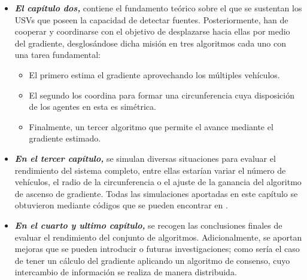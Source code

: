 \begin{itemize}
	\item \textbf{\emph{El capítulo dos,}} contiene el fundamento teórico sobre el que se sustentan los USVs que poseen la capacidad de detectar fuentes. Posteriormente, han de cooperar y coordinarse con el objetivo de desplazarse hacia ellas por medio del gradiente, desglosándose dicha misión en tres algoritmos cada uno con una tarea fundamental: 
	\begin{itemize}
		\item El primero estima el gradiente aprovechando los múltiples vehículos.
		\item El segundo los coordina para formar una circunferencia cuya disposición de los agentes en esta es simétrica.
		\item Finalmente, un tercer algoritmo que permite el avance mediante el gradiente estimado.
	\end{itemize}
	\item  \textbf{\emph{En el tercer capítulo,}} se simulan diversas situaciones para evaluar el rendimiento del sistema completo, entre ellas estarían variar el número de vehículos, el radio de la circunferencia o el ajuste de la ganancia del algoritmo de ascenso de gradiente. Todas las simulaciones aportadas en este capítulo se obtuvieron mediante códigos que se pueden encontrar en \cite{Git__todos}.
	\item \textbf{\emph{En el cuarto y ultimo capítulo,}} se recogen las conclusiones finales de evaluar el rendimiento del conjunto de algoritmos. Adicionalmente, se aportan mejoras que se pueden introducir o futuras investigaciones; como sería el caso de tener un cálculo del gradiente aplicando un algoritmo de consenso, cuyo intercambio de información se realiza de manera distribuida.
\end{itemize}

